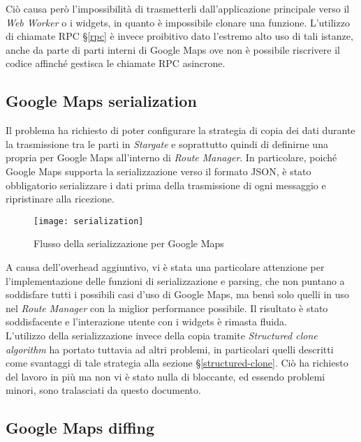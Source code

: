 Ciò causa però l'impossibilità di trasmetterli dall'applicazione principale verso il \textit{Web Worker} o i widgets, in quanto è impossibile clonare una funzione. L'utilizzo di chiamate RPC §\ref{rpc} è invece proibitivo dato l'estremo alto uso di tali istanze, anche da parte di parti interni di Google Maps ove non è possibile riscrivere il codice affinché gestisca le chiamate RPC asincrone. \\

\subsection{Google Maps serialization}

Il problema ha richiesto di poter configurare la strategia di copia dei dati durante la trasmissione tra le parti in \textit{Stargate} e soprattutto quindi di definirne una propria per Google Maps all'interno di \textit{Route Manager}. In particolare, poiché Google Maps supporta la serializzazione verso il formato \gls{JSON}, è stato obbligatorio serializzare i dati prima della trasmissione di ogni messaggio e ripristinare alla ricezione.

\begin{figure}[H] 
  \centering 
  \texttt{[image: serialization]} 
  \caption{Flusso della serializzazione per Google Maps}
\end{figure}

A causa dell'overhead aggiuntivo, vi è stata una particolare attenzione per l'implementazione delle funzioni di serializzazione e parsing, che non puntano a soddisfare tutti i possibili casi d'uso di Google Maps, ma bensì solo quelli in uso nel \textit{Route Manager} con la miglior performance possibile. Il risultato è stato soddisfacente e l'interazione utente con i widgets è rimasta fluida. \\

L'utilizzo della serializzazione invece della copia tramite \textit{Structured clone algorithm} ha portato tuttavia ad altri problemi, in particolari quelli descritti come svantaggi di tale strategia alla sezione §\ref{structured-clone}. Ciò ha richiesto del lavoro in più ma non vi è stato nulla di bloccante, ed essendo problemi minori, sono tralasciati da questo documento.

\subsection{Google Maps diffing}

